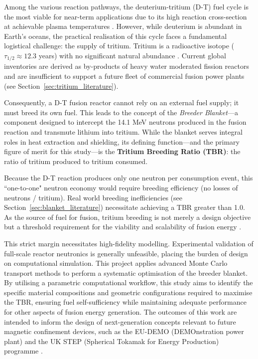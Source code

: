 \documentclass[12pt]{article}
\begin{document}
Among the various reaction pathways, the deuterium-tritium (D-T) fuel cycle is the most viable for
near-term applications due to its high reaction cross-section at achievable plasma temperatures
\cite{heckrotte_factors_1971}. However, while deuterium is abundant in Earth's oceans, the practical
realisation of this cycle faces a fundamental logistical challenge: the supply of tritium. Tritium
is a radioactive isotope ($\tau_{1/2} \approx 12.3$ years) with no significant natural abundance
\cite{brown_endfb-viii0_2018}. Current global inventories are derived as by-products of heavy water
moderated fission reactors and are insufficient to support a future fleet of commercial fusion power
plants (see Section~\ref{sec:tritium_literature}).

Consequently, a D-T fusion reactor cannot rely on an external fuel supply; it must breed its own
fuel. This leads to the concept of the \textit{Breeder Blanket}—a component designed to intercept
the 14.1 MeV neutrons produced in the fusion reaction and transmute lithium into tritium. While the
blanket serves integral roles in heat extraction and shielding, its defining function—and the
primary figure of merit for this study—is the \textbf{Tritium Breeding Ratio (TBR)}: the ratio of
tritium produced to tritium consumed.

Because the D-T reaction produces only one neutron per consumption event, this ``one-to-one" neutron
economy would require breeding efficiency (no losses of neutrons / tritium). Real world breeding
inefficiencies (see Section~\ref{sec:blanket_literature}) necessitate achieving a TBR greater than
1.0. As the source of fuel for fusion, tritium breeding is not merely a design objective but a
threshold requirement for the viability and scalability of fusion energy \cite{sawan_physics_2006}.

This strict margin necessitates high-fidelity modelling. Experimental validation of full-scale
reactor neutronics is generally unfeasible, placing the burden of design on computational
simulation. This project applies advanced Monte Carlo transport methods to perform a systematic
optimisation of the breeder blanket. By utilising a parametric computational workflow, this study
aims to identify the specific material compositions and geometric configurations required to
maximise the TBR, ensuring fuel self-sufficiency while maintaining adequate performance for other
aspects of fusion energy generation. The outcomes of this work are intended to inform the design of
next-generation concepts relevant to future magnetic confinement devices, such as the EU-DEMO
(DEMOnstration power plant) \cite{federici_european_2017} and the UK STEP (Spherical Tokamak for
Energy Production) programme \cite{lord_fusing_2024}.
\end{document}
